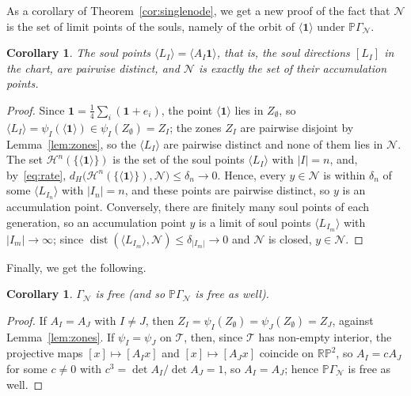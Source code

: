 \documentclass[11pt]{amsart}
\newtheorem{corollary}[proposition]{Corollary}
\theoremstyle{definition}
\theoremstyle{remark}
\newcommand{\one}{\mathbf 1}
\newcommand{\RP}{\mathbb{RP}}
\newcommand{\cN}{\mathcal N}
\newcommand{\cT}{\mathcal T}
\newcommand{\GN}{\Gamma_{\mathcal N}}
\newcommand{\PGN}{{\mathbb P}\Gamma_{\mathcal N}}
\newcommand{\abs}[1]{\lvert #1\rvert}
\newcommand{\pr}[1]{\langle #1\rangle}
\begin{document}
\medskip
As a corollary of Theorem~\ref{cor:singlenode}, we get a new proof of the fact that $\cN$ is the set of limit points of the souls, namely of the orbit of $\pr\one$ under $\PGN$.

\begin{corollary}
\label{cor:accumulation}
    The soul points $\pr{L_I}=\pr{A_I\one}$, that is, the soul directions $[L_I]$ in the chart, are pairwise distinct, and $\cN$ is exactly the set of their accumulation points.
\end{corollary}

\begin{proof}
Since $\one=\frac14\sum_i(\one+e_i)$, the point $\pr\one$ lies in $Z_\emptyset$, so $\pr{L_I}=\psi_I(\pr\one)\in\psi_I(Z_\emptyset)=Z_I$; the zones $Z_I$ are pairwise disjoint by Lemma~\ref{lem:zones}, so the $\pr{L_I}$ are pairwise distinct and none of them lies in $\cN$.
The set $\mathcal H^n(\{\pr\one\})$ is the set of the soul points $\pr{L_I}$ with $\abs I=n$, and, by~\eqref{eq:rate}, $d_H\bigl(\mathcal H^n(\{\pr\one\}),\cN\bigr)\le\delta_n\to0$.
Hence, every $y\in\cN$ is within $\delta_n$ of some $\pr{L_{I_n}}$ with $\abs{I_n}=n$, and these points are pairwise distinct, so $y$ is an accumulation point.
Conversely, there are finitely many soul points of each generation, so an accumulation point $y$ is a limit of soul points $\pr{L_{I_m}}$ with $\abs{I_m}\to\infty$; since $\operatorname{dist}(\pr{L_{I_m}},\cN)\le\delta_{\abs{I_m}}\to0$ and $\cN$ is closed, $y\in\cN$.
\end{proof}

Finally, we get the following.

\begin{corollary}
    \label{cor: free}
    $\GN$ is free (and so $\PGN$ is free as well).
\end{corollary}

\begin{proof}
    If $A_I=A_J$ with $I\neq J$, then $Z_I=\psi_I(Z_\emptyset)=\psi_J(Z_\emptyset)=Z_J$, against Lemma~\ref{lem:zones}. If $\psi_I=\psi_J$ on $\cT$, then, since $\cT$ has non-empty interior, the projective maps $[x]\mapsto[A_Ix]$ and $[x]\mapsto[A_Jx]$ coincide on $\RP^2$, so $A_I=cA_J$ for some $c\neq0$ with $c^3=\det A_I/\det A_J=1$, so $A_I=A_J$; hence $\PGN$ is free as well.
\end{proof}
\end{document}
